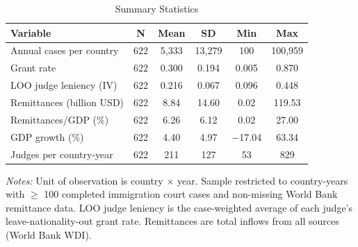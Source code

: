 \begin{table}[!t]
\centering
\caption{Summary Statistics}
\label{tab:summary}
\begin{threeparttable}
\begin{tabular}{lccccc}
\hline\hline
Variable & N & Mean & SD & Min & Max \\
\hline
Annual cases per country & 622 & 5,333 & 13,279 & 100 & 100,959 \\
Grant rate & 622 & 0.300 & 0.194 & 0.005 & 0.870 \\
LOO judge leniency (IV) & 622 & 0.216 & 0.067 & 0.096 & 0.448 \\
Remittances (billion USD) & 622 & 8.84 & 14.60 & 0.02 & 119.53 \\
Remittances/GDP (\%) & 622 & 6.26 & 6.12 & 0.02 & 27.00 \\
GDP growth (\%) & 622 & 4.40 & 4.97 & $-$17.04 & 63.34 \\
Judges per country-year & 622 & 211 & 127 & 53 & 829 \\
\hline\hline
\end{tabular}
\begin{tablenotes}[flushleft]
\small
\item \textit{Notes:} Unit of observation is country $\times$ year. Sample restricted to country-years with $\geq$ 100 completed immigration court cases and non-missing World Bank remittance data. LOO judge leniency is the case-weighted average of each judge's leave-nationality-out grant rate. Remittances are total inflows from all sources (World Bank WDI).
\end{tablenotes}
\end{threeparttable}
\end{table}

